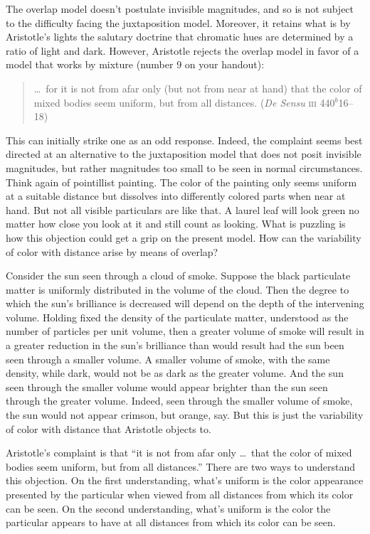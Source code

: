 The overlap model doesn't postulate invisible magnitudes, and so is not subject to the difficulty facing the juxtaposition model. Moreover, it retains what is by Aristotle's lights the salutary doctrine that chromatic hues are determined by a ratio of light and dark. However, Aristotle rejects the overlap model in favor of a model that works by mixture (number 9 on your handout):
\begin{quote}
	\ldots\ for it is not from afar only (but not from near at hand) that the color of mixed bodies seem uniform, but from all distances. (\emph{De Sensu} \textsc{iii} 440\( ^{b} \)16--18)
\end{quote}
This can initially strike one as an odd response. Indeed, the complaint seems best directed at an alternative to the juxtaposition model that does not posit invisible magnitudes, but rather magnitudes too small to be seen in normal circumstances. Think again of pointillist painting. The color of the painting only seems uniform at a suitable distance but dissolves into differently colored parts when near at hand. But not all visible particulars are like that. A laurel leaf will look green no matter how close you look at it and still count as looking. What is puzzling is how this objection could get a grip on the present model. How can the variability of color with distance arise by means of overlap?

Consider the sun seen through a cloud of smoke. Suppose the black particulate matter is uniformly distributed in the volume of the cloud. Then the degree to which the sun's brilliance is decreased will depend on the depth of the intervening volume. Holding fixed the density of the particulate matter, understood as the number of particles per unit volume, then a greater volume of smoke will result in a greater reduction in the sun's brilliance than would result had the sun been seen through a smaller volume. A smaller volume of smoke, with the same density, while dark, would not be as dark as the greater volume. And the sun seen through the smaller volume would appear brighter than the sun seen through the greater volume. Indeed, seen through the smaller volume of smoke, the sun would not appear crimson, but orange, say. But this is just the variability of color with distance that Aristotle objects to.

Aristotle's complaint is that ``it is not from afar only \ldots\ that the color of mixed bodies seem uniform, but from all distances.'' There are two ways to understand this objection. On the first understanding, what's uniform is the color appearance presented by the particular when viewed from all distances from which its color can be seen. On the second understanding, what's uniform is the color the particular appears to have at all distances from which its color can be seen.

